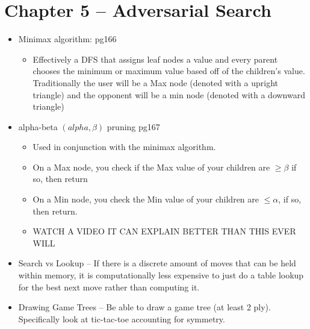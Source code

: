 \documentclass{article}
\begin{document}
\section*{Chapter 5 -- Adversarial Search}
\begin{itemize}
	\item Minimax algorithm: pg166
	\begin{itemize}
		\item Effectively a DFS that assigns leaf nodes a value and every parent chooses the minimum or maximum value based off of the children's value. Traditionally the user will be a Max node (denoted with a upright triangle) and the opponent will be a min node (denoted with a downward triangle)
	\end{itemize}
	\item alpha-beta $(alpha, \beta)$ pruning pg167
	\begin{itemize}
		\item Used in conjunction with the minimax algorithm. 
		\item On a Max node, you check if the Max value of your children are $\geq \beta$ if so, then return 
		\item On a Min node, you check the Min value of your children are $\leq \alpha$, if so, then return.
		\item WATCH A VIDEO IT CAN EXPLAIN BETTER THAN THIS EVER WILL
	\end{itemize}
	\item Search vs Lookup -- If there is a discrete amount of moves that can be held within memory, it is computationally less expensive to just do a table lookup for the best next move rather than computing it.
	\item Drawing Game Trees -- Be able to draw a game tree (at least 2 ply). Specifically look at tic-tac-toe accounting for symmetry.
\end{itemize}
\end{document}
